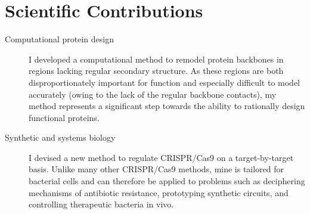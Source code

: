\section{Scientific Contributions}

\begin{description}

\item[Computational protein design] 
I developed a computational method to remodel protein backbones in regions 
lacking regular secondary structure.  As these regions are both 
disproportionately important for function and especially difficult to model 
accurately (owing to the lack of the regular backbone contacts), my method 
represents a significant step towards the ability to rationally design 
functional proteins.

\item[Synthetic and systems biology]
I devised a new method to regulate CRISPR/Cas9 on a target-by-target basis.  
Unlike many other CRISPR/Cas9 methods, mine is tailored for bacterial cells and 
can therefore be applied to problems such as deciphering mechanisms of 
antibiotic resistance, prototyping synthetic circuits, and controlling 
therapeutic bacteria in vivo.

\end{description}
